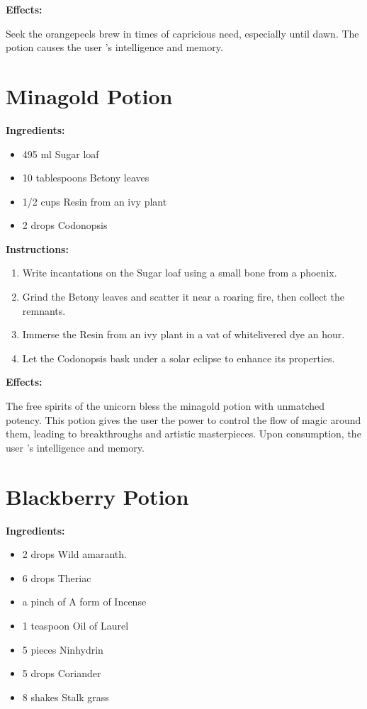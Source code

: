 \documentclass{article}
\begin{document}
\textbf{Effects:}

Seek the orangepeels brew in times of capricious need, especially until dawn. The potion causes the user 's intelligence and memory.

\newpage
\section*{Minagold Potion}

\textbf{Ingredients:}

\begin{itemize}
  \item 495 ml Sugar loaf
  \item 10 tablespoons Betony leaves
  \item 1/2 cups Resin from an ivy plant
  \item 2 drops Codonopsis
\end{itemize}

\textbf{Instructions:}

\begin{enumerate}
  \item Write incantations on the Sugar loaf using a small bone from a phoenix.
  \item Grind the Betony leaves and scatter it near a roaring fire, then collect the remnants.
  \item Immerse the Resin from an ivy plant in a vat of whitelivered dye an hour.
  \item Let the Codonopsis bask under a solar eclipse to enhance its properties.
\end{enumerate}

\textbf{Effects:}

The free spirits of the unicorn bless the minagold potion with unmatched potency. This potion gives the user the power to control the flow of magic around them, leading to breakthroughs and artistic masterpieces. Upon consumption, the user 's intelligence and memory.

\newpage
\section*{Blackberry Potion}

\textbf{Ingredients:}

\begin{itemize}
  \item 2 drops Wild amaranth.
  \item 6 drops Theriac
  \item a pinch of A form of Incense
  \item 1 teaspoon Oil of Laurel
  \item 5 pieces Ninhydrin
  \item 5 drops Coriander
  \item 8 shakes Stalk grass
\end{itemize}
\end{document}
